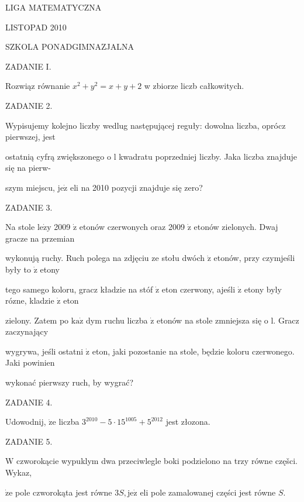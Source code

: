 \documentclass[a4paper,12pt]{article}
\begin{document}
LIGA MATEMATYCZNA

LISTOPAD 2010

SZKOLA PONADGIMNAZJALNA

ZADANIE I.

Rozwiąz równanie $x^{2}+y^{2}=x+y+2$ w zbiorze liczb całkowitych.

ZADANIE 2.

Wypisujemy kolejno liczby wedlug następującej reguły: dowolna liczba, oprócz pierwszej, jest

ostatnią cyfrą zwiększonego o l kwadratu poprzedniej liczby. Jaka liczba znajduje się na pierw-

szym miejscu, $\mathrm{j}\mathrm{e}\dot{\mathrm{z}}$ eli na 2010 pozycji znajduje się zero?

ZADANIE 3.

Na stole $\mathrm{l}\mathrm{e}\dot{\mathrm{z}}\mathrm{y}$ 2009 $\dot{\mathrm{z}}$ etonów czerwonych oraz 2009 $\dot{\mathrm{z}}$ etonów zielonych. Dwaj gracze na przemian

wykonują ruchy. Ruch polega na zdjęciu ze stołu dwóch $\dot{\mathrm{z}}$ etonów, przy czymjeśli były to $\dot{\mathrm{z}}$ etony

tego samego koloru, gracz kładzie na stóf $\dot{\mathrm{z}}$ eton czerwony, ajeśli $\dot{\mathrm{z}}$ etony byly rózne, kladzie $\dot{\mathrm{z}}$ eton

zielony. Zatem po $\mathrm{k}\mathrm{a}\dot{\mathrm{z}}$ dym ruchu liczba $\dot{\mathrm{z}}$ etonów na stole zmniejsza się o l. Gracz zaczynający

wygrywa, jeśli ostatni $\dot{\mathrm{z}}$ eton, jaki pozostanie na stole, będzie koloru czerwonego. Jaki powinien

wykonać pierwszy ruch, by wygrać?

ZADANIE 4.

Udowodnij, $\dot{\mathrm{z}}\mathrm{e}$ liczba $3^{2010}-5\cdot 15^{1005}+5^{2012}$ jest złozona.

ZADANIE 5.

$\mathrm{W}$ czworokącie wypuklym dwa przeciwlegle boki podzielono na trzy równe częšci. Wykaz,

$\dot{\mathrm{z}}\mathrm{e}$ pole czworokąta jest równe $3S, \mathrm{j}\mathrm{e}\dot{\mathrm{z}}$ eli pole zamalowanej części jest równe $S.$
\end{document}

